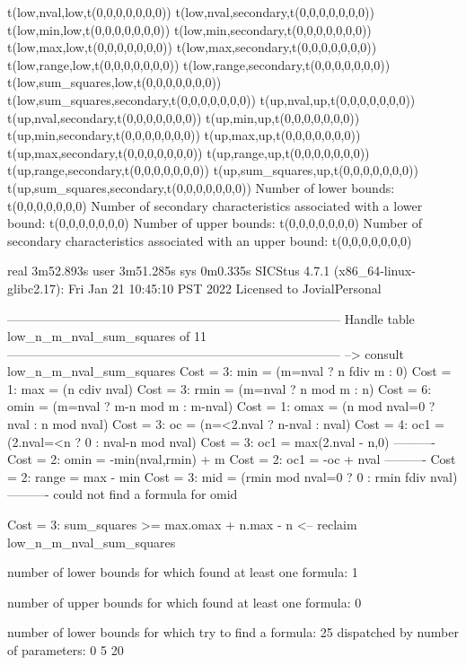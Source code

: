 t(low,nval,low,t(0,0,0,0,0,0,0))
t(low,nval,secondary,t(0,0,0,0,0,0,0))
t(low,min,low,t(0,0,0,0,0,0,0))
t(low,min,secondary,t(0,0,0,0,0,0,0))
t(low,max,low,t(0,0,0,0,0,0,0))
t(low,max,secondary,t(0,0,0,0,0,0,0))
t(low,range,low,t(0,0,0,0,0,0,0))
t(low,range,secondary,t(0,0,0,0,0,0,0))
t(low,sum_squares,low,t(0,0,0,0,0,0,0))
t(low,sum_squares,secondary,t(0,0,0,0,0,0,0))
t(up,nval,up,t(0,0,0,0,0,0,0))
t(up,nval,secondary,t(0,0,0,0,0,0,0))
t(up,min,up,t(0,0,0,0,0,0,0))
t(up,min,secondary,t(0,0,0,0,0,0,0))
t(up,max,up,t(0,0,0,0,0,0,0))
t(up,max,secondary,t(0,0,0,0,0,0,0))
t(up,range,up,t(0,0,0,0,0,0,0))
t(up,range,secondary,t(0,0,0,0,0,0,0))
t(up,sum_squares,up,t(0,0,0,0,0,0,0))
t(up,sum_squares,secondary,t(0,0,0,0,0,0,0))
Number of lower bounds:                                             t(0,0,0,0,0,0,0)
Number of secondary characteristics associated with a lower bound:  t(0,0,0,0,0,0,0)
Number of upper bounds:                                             t(0,0,0,0,0,0,0)
Number of secondary characteristics associated with an upper bound: t(0,0,0,0,0,0,0)

real	3m52.893s
user	3m51.285s
sys	0m0.335s
SICStus 4.7.1 (x86_64-linux-glibc2.17): Fri Jan 21 10:45:10 PST 2022
Licensed to JovialPersonal


--------------------------------------------------------------------------------
Handle table low_n_m_nval_sum_squares of 11
--------------------------------------------------------------------------------
--> consult low_n_m_nval_sum_squares
Cost =  3:  min   = (m=nval ? n fdiv m : 0)
Cost =  1:  max   = (n cdiv nval)
Cost =  3:  rmin  = (m=nval ? n mod m : n)
Cost =  6:  omin  = (m=nval ? m-n mod m : m-nval)
Cost =  1:  omax  = (n mod nval=0 ? nval : n mod nval)
Cost =  3:  oc    = (n=<2.nval ? n-nval : nval)
Cost =  4:  oc1   = (2.nval=<n ? 0 : nval-n mod nval)
Cost =  3:  oc1   = max(2.nval - n,0)
----------
Cost =  2:  omin  = -min(nval,rmin) + m
Cost =  2:  oc1   = -oc + nval
----------
Cost =  2:  range = max - min
Cost =  3:  mid   = (rmin mod nval=0 ? 0 : rmin fdiv nval)
----------
could not find a formula for omid

Cost =  3:  sum_squares >= max.omax + n.max - n
<-- reclaim low_n_m_nval_sum_squares

number of lower bounds for which found at least one formula: 1

number of upper bounds for which found at least one formula: 0

number of lower bounds for which try to find a formula: 25
dispatched by number of parameters: 0  5  20

